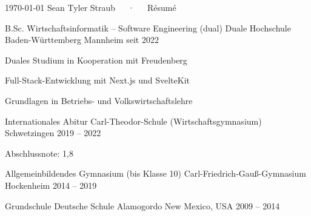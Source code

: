 \documentclass[11pt, a4paper]{awesome-cv}
\begin{document}
\makecvheader[C]

\makecvfooter
  {\today}
  {Sean Tyler Straub~~~·~~~Résumé}
  {\thepage}


\begin{cventries}

\cventry
  {B.Sc. Wirtschaftsinformatik – Software Engineering (dual)}
  {Duale Hochschule Baden-Württemberg}
  {Mannheim}
  {seit 2022}
  {
    \begin{cvitems}
      \item {Duales Studium in Kooperation mit Freudenberg}
      \item {Full-Stack-Entwicklung mit Next.js und SvelteKit}
      \item {Grundlagen in Betriebs- und Volkswirtschaftslehre}
    \end{cvitems}
  }

\cventry
  {Internationales Abitur}
  {Carl-Theodor-Schule (Wirtschaftsgymnasium)}
  {Schwetzingen}
  {2019 -- 2022}
  {
    \begin{cvitems}
      \item {Abschlussnote: 1,8}
    \end{cvitems}
  }

\cventry
  {Allgemeinbildendes Gymnasium (bis Klasse 10)}
  {Carl-Friedrich-Gauß-Gymnasium}
  {Hockenheim}
  {2014 -- 2019}
  {}

\cventry
  {Grundschule}
  {Deutsche Schule Alamogordo}
  {New Mexico, USA}
  {2009 -- 2014}
  {}

\end{cventries}

\end{document}
